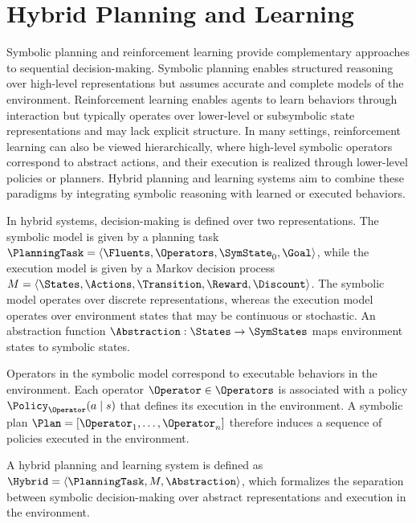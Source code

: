 \section{Hybrid Planning and Learning}
\label{sec:hybrid}

Symbolic planning and reinforcement learning provide complementary approaches to sequential decision-making. Symbolic planning enables structured reasoning over high-level representations but assumes accurate and complete models of the environment. Reinforcement learning enables agents to learn behaviors through interaction but typically operates over lower-level or subsymbolic state representations and may lack explicit structure. In many settings, reinforcement learning can also be viewed hierarchically, where high-level symbolic operators correspond to abstract actions, and their execution is realized through lower-level policies or planners. Hybrid planning and learning systems aim to combine these paradigms by integrating symbolic reasoning with learned or executed behaviors.

In hybrid systems, decision-making is defined over two representations. The symbolic model is given by a planning task $\PlanningTask = \langle \Fluents, \Operators, \SymState_0, \Goal \rangle$, while the execution model is given by a Markov decision process $M = \langle \States, \Actions, \Transition, \Reward, \Discount \rangle$. The symbolic model operates over discrete representations, whereas the execution model operates over environment states that may be continuous or stochastic. An abstraction function $\Abstraction : \States \rightarrow \SymStates$ maps environment states to symbolic states.

Operators in the symbolic model correspond to executable behaviors in the environment. Each operator $\Operator \in \Operators$ is associated with a policy $\Policy_{\Operator}(a \mid s)$ that defines its execution in the environment. A symbolic plan $\Plan = [\Operator_1, \dots, \Operator_n]$ therefore induces a sequence of policies executed in the environment.

A hybrid planning and learning system is defined as $\Hybrid = \langle \PlanningTask, M, \Abstraction \rangle$, which formalizes the separation between symbolic decision-making over abstract representations and execution in the environment.